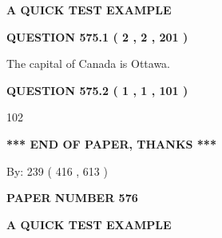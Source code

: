 \documentclass[12pt]{article}
\begin{document}
   
 \vspace{0.2in}
{\LARGE {\textbf{ A QUICK TEST EXAMPLE}}}
   
   
  
\vspace{0.2in}
  
{\textbf{\Large{QUESTION
575.1 
 ( 2 , 2 , 201 )
}}}
  
  
 
 
\noindent{}
 
 
The capital of Canada is Ottawa.
 
 
 
 
  
\vspace{0.2in}
  
{\textbf{\Large{QUESTION
575.2 
 ( 1 , 1 , 101 )
}}}
  
  
 
 
\noindent{}

102
 
 
   
   
 \vspace{0.2in}
 
   
   
   
   
\vspace{1.0in} 
{\textbf{\large{ *** END OF PAPER, THANKS *** }}} 
   
   
\hspace{1.0in} By: 
 239 ( 416 ,  613 )
   
   
   
   
\newpage 
\setcounter{page}{ 
   576001 } 
   
   
   
   
 {\textbf{ \Large{ PAPER NUMBER  576  }}}
   
   
\vspace{0.2in}
   
   
   
   
   
   
 \vspace{0.2in}
{\LARGE {\textbf{ A QUICK TEST EXAMPLE}}}
   
   
  
\vspace{0.2in}
  
\end{document}
